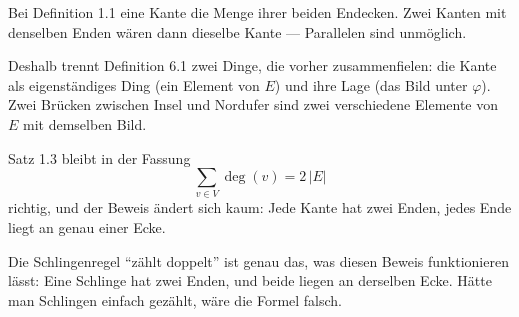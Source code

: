 \begin{merksatz}
Bei Definition 1.1  eine Kante die Menge ihrer beiden Endecken. Zwei Kanten mit denselben Enden wären dann dieselbe Kante --- Parallelen sind unmöglich.

Deshalb trennt Definition 6.1 zwei Dinge, die vorher zusammenfielen: die Kante als eigenständiges Ding (ein Element von $E$) und ihre Lage (das Bild unter $\varphi$). Zwei Brücken zwischen Insel und Nordufer sind zwei verschiedene Elemente von $E$ mit demselben Bild.

\begin{center}
\begin{minipage}{0.88\textwidth}
\end{minipage}
\end{center}
\end{merksatz}

\begin{merksatz}
Satz 1.3 bleibt in der Fassung
\[ \sum_{v \in V} \deg(v) = 2\,|E| \]
richtig, und der Beweis ändert sich kaum: Jede Kante hat zwei Enden, jedes Ende liegt an genau einer Ecke.

Die Schlingenregel \enquote{zählt doppelt} ist genau das, was diesen Beweis funktionieren lässt: Eine Schlinge hat zwei Enden, und beide liegen an derselben Ecke. Hätte man Schlingen einfach gezählt, wäre die Formel falsch.
\end{merksatz}

